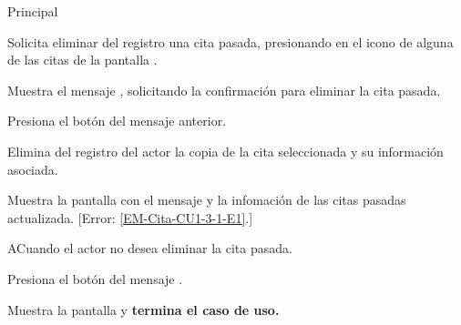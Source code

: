 \begin{UCtrayectoria}{Principal}

	\UCpaso [\UCactor] Solicita eliminar del registro una cita pasada, presionando en el icono  de alguna de las citas de la pantalla .

	\UCpaso Muestra el mensaje , solicitando la confirmación para eliminar la cita pasada. 

	\UCpaso Presiona el botón  del mensaje anterior.  
 
	\UCpaso Elimina del registro del actor la copia de la cita seleccionada y su información asociada. 

	\UCpaso Muestra la pantalla  con el mensaje  y la infomación de las citas pasadas actualizada. [Error: \ref{EM-Cita-CU1-3-1-E1}.]
	

\end{UCtrayectoria}

\begin{UCtrayectoriaA}{A}{Cuando el actor no desea eliminar la cita pasada.}

	\UCpaso Presiona el botón  del mensaje .

	\UCpaso Muestra la pantalla  y \textbf{termina el caso de uso.}

\end{UCtrayectoriaA}